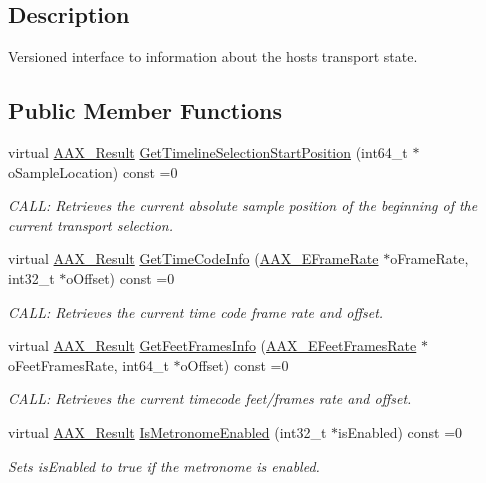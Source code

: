 \subsection{Description}
Versioned interface to information about the host\textquotesingle{}s transport state. \subsection*{Public Member Functions}
\begin{DoxyCompactItemize}
\item 
virtual \hyperlink{a00149_a4d8f69a697df7f70c3a8e9b8ee130d2f}{A\+A\+X\+\_\+\+Result} \hyperlink{a00083_a2ed1e7eb242706350126e1f0f80ef89a}{Get\+Timeline\+Selection\+Start\+Position} (int64\+\_\+t $\ast$o\+Sample\+Location) const =0
\begin{DoxyCompactList}\small\item\em C\+A\+L\+L\+: Retrieves the current absolute sample position of the beginning of the current transport selection. \end{DoxyCompactList}\item 
virtual \hyperlink{a00149_a4d8f69a697df7f70c3a8e9b8ee130d2f}{A\+A\+X\+\_\+\+Result} \hyperlink{a00083_a3190f47a60f2b99d3a6b904f0eada0bf}{Get\+Time\+Code\+Info} (\hyperlink{a00206_a1271a51553bf508de59864334111aa8f}{A\+A\+X\+\_\+\+E\+Frame\+Rate} $\ast$o\+Frame\+Rate, int32\+\_\+t $\ast$o\+Offset) const =0
\begin{DoxyCompactList}\small\item\em C\+A\+L\+L\+: Retrieves the current time code frame rate and offset. \end{DoxyCompactList}\item 
virtual \hyperlink{a00149_a4d8f69a697df7f70c3a8e9b8ee130d2f}{A\+A\+X\+\_\+\+Result} \hyperlink{a00083_af56a07926c753c6b225c316c5b516aa5}{Get\+Feet\+Frames\+Info} (\hyperlink{a00206_a8a0c9dafef741a26ee8c06f7285a0dfa}{A\+A\+X\+\_\+\+E\+Feet\+Frames\+Rate} $\ast$o\+Feet\+Frames\+Rate, int64\+\_\+t $\ast$o\+Offset) const =0
\begin{DoxyCompactList}\small\item\em C\+A\+L\+L\+: Retrieves the current timecode feet/frames rate and offset. \end{DoxyCompactList}\item 
virtual \hyperlink{a00149_a4d8f69a697df7f70c3a8e9b8ee130d2f}{A\+A\+X\+\_\+\+Result} \hyperlink{a00083_a64bc3e6707297e32190e7aa290513521}{Is\+Metronome\+Enabled} (int32\+\_\+t $\ast$is\+Enabled) const =0
\begin{DoxyCompactList}\small\item\em Sets is\+Enabled to true if the metronome is enabled. \end{DoxyCompactList}\end{DoxyCompactItemize}


